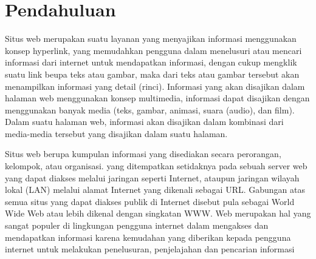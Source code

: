 \section{Pendahuluan}
	Situs web merupakan suatu layanan yang menyajikan informasi menggunakan konsep hyperlink, yang memudahkan pengguna dalam menelusuri atau mencari informasi dari internet untuk mendapatkan informasi, dengan cukup mengklik suatu link beupa teks atau gambar, maka dari teks atau gambar tersebut akan menampilkan informasi yang detail (rinci).
Informasi yang akan disajikan dalam halaman web menggunakan konsep multimedia, informasi dapat disajikan dengan menggunakan banyak media (teks, gambar, animasi, suara (audio), dan film). Dalam suatu halaman web, informasi akan disajikan dalam kombinasi dari media-media tersebut yang disajikan dalam suatu halaman.
\par
Situs web berupa kumpulan informasi yang disediakan secara perorangan, kelompok, atau organisasi. yang ditempatkan setidaknya pada sebuah server web yang dapat diakses melalui jaringan seperti Internet, ataupun jaringan wilayah lokal (LAN) melalui alamat Internet yang dikenali sebagai URL. Gabungan atas semua situs yang dapat diakses publik di Internet disebut pula sebagai World Wide Web atau lebih dikenal dengan singkatan WWW. Web merupakan hal yang sangat populer di lingkungan pengguna internet dalam mengakses dan mendapatkan informasi karena kemudahan yang diberikan kepada pengguna internet untuk melakukan penelusuran, penjelajahan dan pencarian informasi   
